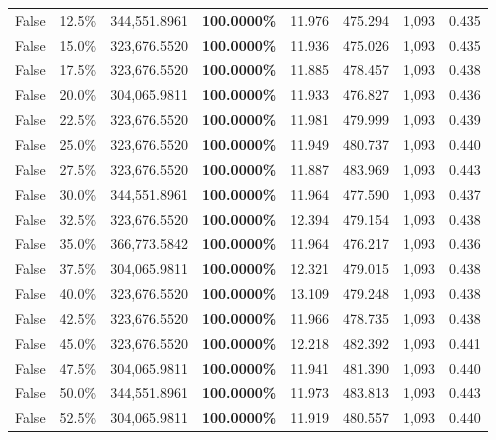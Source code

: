 \begin{table}[H]
\begin{tabular}{lllrllll}
\cline{1-8}
False & 12.5\% & 344,551.8961 & \bfseries \color{red} 100.0000\% & 11.976 & 475.294 & 1,093 & 0.435 \\
\cline{1-8}
False & 15.0\% & 323,676.5520 & \bfseries \color{red} 100.0000\% & 11.936 & 475.026 & 1,093 & 0.435 \\
\cline{1-8}
False & 17.5\% & 323,676.5520 & \bfseries \color{red} 100.0000\% & 11.885 & 478.457 & 1,093 & 0.438 \\
\cline{1-8}
False & 20.0\% & 304,065.9811 & \bfseries \color{red} 100.0000\% & 11.933 & 476.827 & 1,093 & 0.436 \\
\cline{1-8}
False & 22.5\% & 323,676.5520 & \bfseries \color{red} 100.0000\% & 11.981 & 479.999 & 1,093 & 0.439 \\
\cline{1-8}
False & 25.0\% & 323,676.5520 & \bfseries \color{red} 100.0000\% & 11.949 & 480.737 & 1,093 & 0.440 \\
\cline{1-8}
False & 27.5\% & 323,676.5520 & \bfseries \color{red} 100.0000\% & 11.887 & 483.969 & 1,093 & 0.443 \\
\cline{1-8}
False & 30.0\% & 344,551.8961 & \bfseries \color{red} 100.0000\% & 11.964 & 477.590 & 1,093 & 0.437 \\
\cline{1-8}
False & 32.5\% & 323,676.5520 & \bfseries \color{red} 100.0000\% & 12.394 & 479.154 & 1,093 & 0.438 \\
\cline{1-8}
False & 35.0\% & 366,773.5842 & \bfseries \color{red} 100.0000\% & 11.964 & 476.217 & 1,093 & 0.436 \\
\cline{1-8}
False & 37.5\% & 304,065.9811 & \bfseries \color{red} 100.0000\% & 12.321 & 479.015 & 1,093 & 0.438 \\
\cline{1-8}
False & 40.0\% & 323,676.5520 & \bfseries \color{red} 100.0000\% & 13.109 & 479.248 & 1,093 & 0.438 \\
\cline{1-8}
False & 42.5\% & 323,676.5520 & \bfseries \color{red} 100.0000\% & 11.966 & 478.735 & 1,093 & 0.438 \\
\cline{1-8}
False & 45.0\% & 323,676.5520 & \bfseries \color{red} 100.0000\% & 12.218 & 482.392 & 1,093 & 0.441 \\
\cline{1-8}
False & 47.5\% & 304,065.9811 & \bfseries \color{red} 100.0000\% & 11.941 & 481.390 & 1,093 & 0.440 \\
\cline{1-8}
False & 50.0\% & 344,551.8961 & \bfseries \color{red} 100.0000\% & 11.973 & 483.813 & 1,093 & 0.443 \\
\cline{1-8}
False & 52.5\% & 304,065.9811 & \bfseries \color{red} 100.0000\% & 11.919 & 480.557 & 1,093 & 0.440 \\

\end{tabular}
\end{table}
